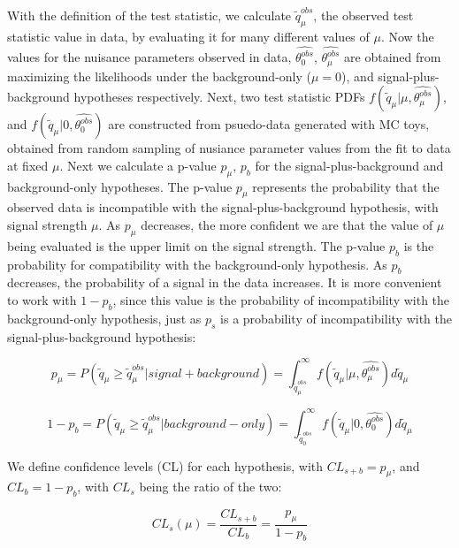 With the definition of the test statistic, we calculate $\tilde{q}_{\mu}^{obs}$, the observed test statistic value in data, by evaluating it for many different
values of $\mu$. Now the values for the nuisance parameters observed in data, $\hat{\theta_{0}^{obs}}$, $\hat{\theta_{\mu}^{obs}}$ are obtained from maximizing
the likelihoods under the background-only ($\mu=0$), and signal-plus-background hypotheses respectively. Next, two test statistic PDFs
$f(\tilde{q}_{\mu}|\mu,\hat{\theta_{\mu}^{obs}})$, and $f(\tilde{q}_{\mu}|0,\hat{\theta_{0}^{obs}})$ are constructed from psuedo-data
generated with MC toys, obtained from random sampling of nusiance parameter values from the fit to data at fixed $\mu$.  Next we calculate a p-value $p_{\mu}$, $p_{b}$
for the signal-plus-background and background-only hypotheses. The p-value $p_{\mu}$ represents the probability that the observed data is incompatible with the
signal-plus-background hypothesis, with signal strength $\mu$. As $p_{\mu}$ decreases, the more confident we are that the value of $\mu$ being evaluated is the
upper limit on the signal strength. The p-value $p_{b}$ is the probability for compatibility with the background-only hypothesis. As $p_{b}$ decreases, the probability
of a signal in the data increases. It is more convenient to work with $1-p_{b}$, since this value is the probability of incompatibility with the background-only hypothesis,
just as $p_{s}$ is a probability of incompatibility with the signal-plus-background hypothesis:

\begin{equation}
\label{eqn:pvalues1}
p_{\mu} = P(\tilde{q}_{\mu} \geq \tilde{q}_{\mu}^{obs}|signal+background) = \int_{\tilde{q}_{\mu}^{obs}}^{\infty} f(\tilde{q}_{\mu}|\mu,\hat{\theta_{\mu}^{obs}}) d\tilde{q}_{\mu}
\end{equation}

\begin{equation}
\label{eqn:pvalues2}
1- p_{b} = P(\tilde{q}_{\mu} \geq \tilde{q}_{\mu}^{obs}|background-only) = \int_{\tilde{q}_{0}^{obs}}^{\infty} f(\tilde{q}_{\mu}|0,\hat{\theta_{0}^{obs}}) d\tilde{q}_{\mu}
\end{equation}

\noindent We define confidence levels (CL) for each hypothesis, with $CL_{s+b} = p_{\mu}$, and $CL_{b} = 1-p_{b}$, with $CL_{s}$ being the ratio of the two:

\begin{equation}
\label{eqn:cls}
CL_{s}(\mu) = \frac{CL_{s+b}}{CL_{b}} = \frac{p_{\mu}}{1-p_{b}}
\end{equation}

